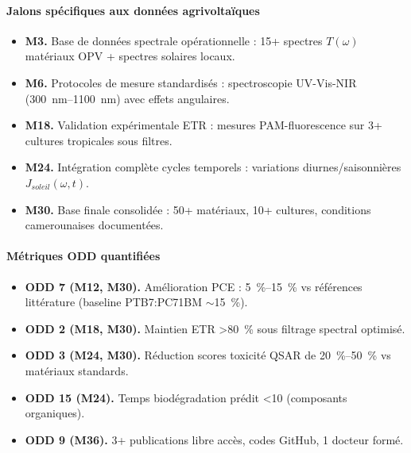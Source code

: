 \documentclass[12pt, a4paper]{article}
\begin{document}
\paragraph{Jalons spécifiques aux données agrivoltaïques}
\begin{itemize}
    \item \textbf{M3.} Base de données spectrale opérationnelle : 15+ spectres $T(\omega)$ matériaux OPV + spectres solaires locaux.
    \item \textbf{M6.} Protocoles de mesure standardisés : spectroscopie UV-Vis-NIR (\SIrange{300}{1100}{\nano\meter}) avec effets angulaires.
    \item \textbf{M18.} Validation expérimentale ETR : mesures PAM-fluorescence sur 3+ cultures tropicales sous filtres.
    \item \textbf{M24.} Intégration complète cycles temporels : variations diurnes/saisonnières $J_{soleil}(\omega,t)$.
    \item \textbf{M30.} Base finale consolidée : 50+ matériaux, 10+ cultures, conditions camerounaises documentées.
\end{itemize}

\paragraph{Métriques ODD quantifiées}
\begin{itemize}
    \item \textbf{ODD 7 (M12, M30).} Amélioration PCE : \SIrange{+5}{+15}{\percent} vs références littérature (baseline PTB7:PC71BM $\sim$\SI{15}{\percent}).
    \item \textbf{ODD 2 (M18, M30).} Maintien ETR \SI{>80}{\percent} sous filtrage spectral optimisé.
    \item \textbf{ODD 3 (M24, M30).} Réduction scores toxicité QSAR de \SIrange{20}{50}{\percent} vs matériaux standards.
    \item \textbf{ODD 15 (M24).} Temps biodégradation prédit \SI{<10}{\year} (composants organiques).
    \item \textbf{ODD 9 (M36).} 3+ publications libre accès, codes GitHub, 1 docteur formé.
\end{itemize}
\end{document}
